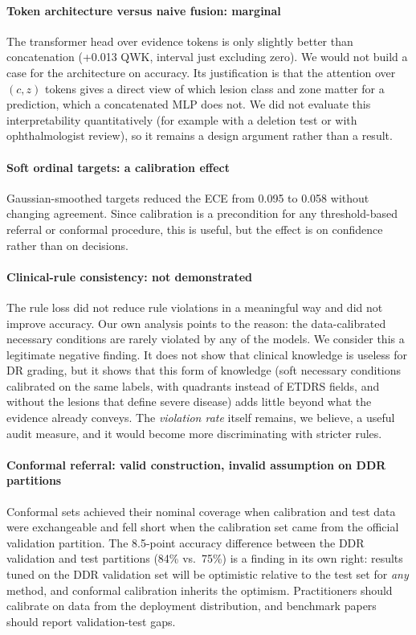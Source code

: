 \paragraph{Token architecture versus naive fusion: marginal} The transformer head over evidence tokens is only slightly better than concatenation (+0.013 QWK, interval just excluding zero). We would not build a case for the architecture on accuracy. Its justification is that the attention over $(c,z)$ tokens gives a direct view of which lesion class and zone matter for a prediction, which a concatenated MLP does not. We did not evaluate this interpretability quantitatively (for example with a deletion test or with ophthalmologist review), so it remains a design argument rather than a result.

\paragraph{Soft ordinal targets: a calibration effect} Gaussian-smoothed targets reduced the ECE from 0.095 to 0.058 without changing agreement. Since calibration is a precondition for any threshold-based referral or conformal procedure, this is useful, but the effect is on confidence rather than on decisions.

\paragraph{Clinical-rule consistency: not demonstrated} The rule loss did not reduce rule violations in a meaningful way and did not improve accuracy. Our own analysis points to the reason: the data-calibrated necessary conditions are rarely violated by any of the models. We consider this a legitimate negative finding. It does not show that clinical knowledge is useless for DR grading, but it shows that this form of knowledge (soft necessary conditions calibrated on the same labels, with quadrants instead of ETDRS fields, and without the lesions that define severe disease) adds little beyond what the evidence already conveys. The \emph{violation rate} itself remains, we believe, a useful audit measure, and it would become more discriminating with stricter rules.

\paragraph{Conformal referral: valid construction, invalid assumption on DDR partitions} Conformal sets achieved their nominal coverage when calibration and test data were exchangeable and fell short when the calibration set came from the official validation partition. The 8.5-point accuracy difference between the DDR validation and test partitions (84\% vs.\ 75\%) is a finding in its own right: results tuned on the DDR validation set will be optimistic relative to the test set for \emph{any} method, and conformal calibration inherits the optimism. Practitioners should calibrate on data from the deployment distribution, and benchmark papers should report validation-test gaps.

